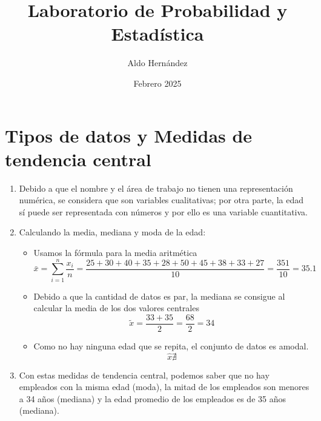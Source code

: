\documentclass[12pt, letterpaper]{article}
\title{Laboratorio de Probabilidad y Estadística}
\author{Aldo Hernández}
\date{Febrero 2025}
\begin{document}
\maketitle

\section{Tipos de datos y Medidas de tendencia central}
\begin{enumerate}
    \item Debido a que el nombre y el área de trabajo no tienen una representación numérica, se considera que son variables cualitativas; por otra parte, la edad sí puede ser representada con números y por ello es una variable cuantitativa.
    \item Calculando la media, mediana y moda de la edad:
    \begin{itemize}
        \item Usamos la fórmula para la media aritmética
        \begin{equation*}
            \bar{x} = \sum_{i = 1}^{n} \frac{x_{i}}{n} = \frac{25+30+40+35+28+50+45+38+33+27}{10} = \frac{351}{10} = 35.1
        \end{equation*}
        \item Debido a que la cantidad de datos es par, la mediana se consigue al calcular la media de los dos valores centrales
        \begin{equation*}
            \tilde{x} = \frac{33+35}{2} = \frac{68}{2} = 34
        \end{equation*}
        \item Como no hay ninguna edad que se repita, el conjunto de datos es amodal.
        \begin{equation*}
            \hat{x} \nexists 
        \end{equation*}
    \end{itemize}
    \item Con estas medidas de tendencia central, podemos saber que no hay empleados con la misma edad (moda), la mitad de los empleados son menores a 34 años (mediana) y la edad promedio de los empleados es de 35 años (mediana).
\end{enumerate}

\newpage
\end{document}
